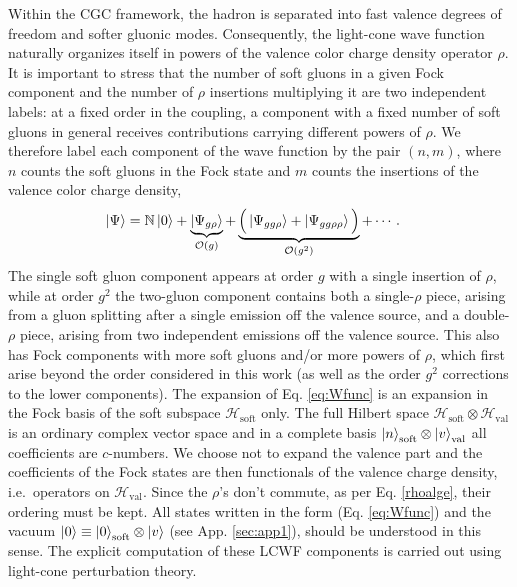 \documentclass[a4paper,11pt]{article}
\def\mf#1{\mathbb{#1}}
\begin{document}
Within the CGC framework, the hadron is separated into fast valence degrees of freedom and softer gluonic modes. Consequently, the light-cone wave function naturally organizes itself in powers of the valence color charge density operator $\rho$. It is important to stress that the number of soft gluons in a given Fock component and the number of $\rho$ insertions multiplying it are two independent labels: at a fixed order in the coupling, a component with a fixed number of soft gluons in general receives contributions carrying different powers of $\rho$. We therefore label each component of the wave function by the pair $(n,m)$, where $n$ counts the soft gluons in the Fock state and $m$ counts the insertions of the valence color charge density,
\begin{align} \label{eq:Wfunc}
\ket{\Psi} & = \mf{N}\ket{0} + \underbrace{\ket{\Psi_{g\rho}}}_{\mathcal{O}(g)} + \underbrace{\Big(\ket{\Psi_{gg\rho}} + \ket{\Psi_{gg\rho\rho}}\Big)}_{\mathcal{O}(g^{2})} +\cdots.
\end{align}
The single soft gluon component appears at order $g$ with a single insertion of $\rho$, while at order $g^{2}$ the two-gluon component contains both a single-$\rho$ piece, arising from a gluon splitting after a single emission off the valence source, and a double-$\rho$ piece, arising from two independent emissions off the valence source. This also has Fock components with more soft gluons and/or more powers of $\rho$, which first arise beyond the order considered in this work (as well as the order $g^{2}$ corrections to the lower components). {\color{blue} The expansion of Eq. \eqref{eq:Wfunc} is an expansion in the Fock basis of the soft subspace {\color{chg}$\mathcal{H}_{\mathrm{soft}}$} only. The full Hilbert space $\mathcal{H}_{\mathrm{soft}}\otimes \mathcal{H}_{\mathrm{val}}$ is an ordinary complex vector space and in a complete basis $\ket{n}_{\mathrm{soft}}\otimes \ket{v}_{\mathrm{val}}$ all coefficients are $c$-numbers. We choose not to expand the valence part and the coefficients of the Fock states are then {\color{chg}functionals of the valence charge density, i.e.\ operators on $\mathcal{H}_{\mathrm{val}}$}. Since the $\rho$'s don't commute, as per Eq. \eqref{rhoalge}, their ordering must be kept. All states written in the form (Eq. \eqref{eq:Wfunc}) and the vacuum $\ket{0} \equiv \ket{0}_{\mathrm{soft}}\otimes \ket{v}$ (see App. \ref{sec:app1}), should be understood in this sense.} The explicit computation of these LCWF components is carried out using light-cone perturbation theory.
\end{document}
